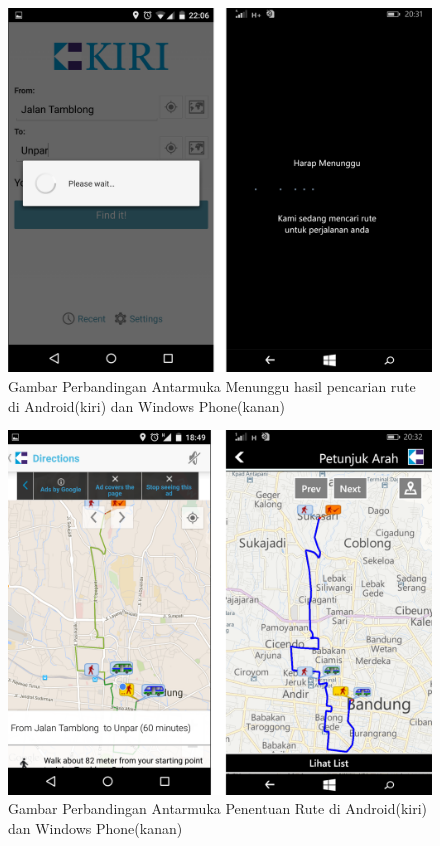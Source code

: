 	\begin{figure}[!h]
		\centering
			\includegraphics[scale=0.15]{Gambar/perbandingan/perbandingan_menunggu}
		\caption{Gambar Perbandingan Antarmuka Menunggu hasil pencarian rute di Android(kiri) dan Windows Phone(kanan)}
		\label{fig:perbandinganMenunggu}
	\end{figure}
	
	\begin{figure}[!h]
		\centering
			\includegraphics[scale=0.15]{Gambar/perbandingan/perbandingan_route}
		\caption{Gambar Perbandingan Antarmuka Penentuan Rute di Android(kiri) dan Windows Phone(kanan)}
		\label{fig:perbandinganRoute}
	\end{figure}
	
